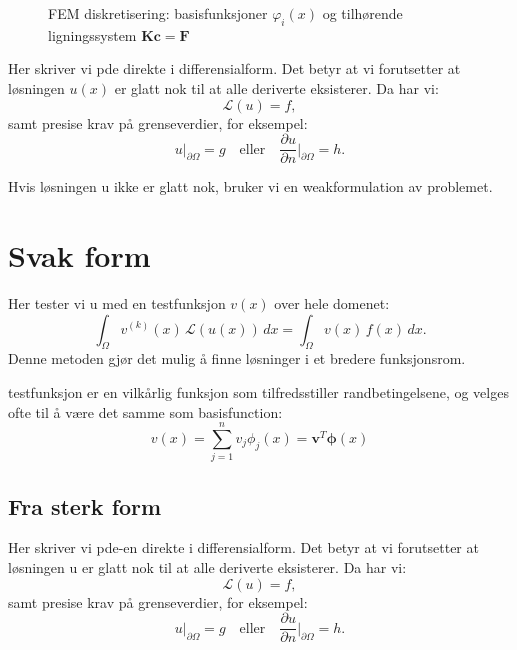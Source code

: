 \begin{figure}[H]
    \caption{FEM diskretisering: basisfunksjoner $\varphi_i(x)$ og tilhørende ligningssystem $\mathbf{K}\mathbf{c} = \mathbf{F}$}
    \label{fig:fem_discretization}
\end{figure}


Her skriver vi pde direkte i differensialform.
Det betyr at vi forutsetter at løsningen \(u(x)\) er glatt nok til at alle deriverte eksisterer.
Da har vi:
\[
    \mathcal{L}(u) = f,
\]
samt presise krav på grenseverdier, for eksempel:
\[
    u|_{\partial \Omega} = g \quad \text{eller} \quad \frac{\partial u}{\partial n}\bigg|_{\partial \Omega} = h.
\]

Hvis løsningen u ikke er glatt nok, bruker vi en weakformulation av problemet.

\section{Svak form}

Her tester vi u med en testfunksjon \(v(x)\) over hele domenet:
\[
    \int_\Omega v^{(k)}(x) \, \mathcal{L}(u(x)) \, dx = \int_\Omega v(x) \, f(x) \, dx.
\]
Denne metoden gjør det mulig å finne løsninger i et bredere funksjonsrom.

testfunksjon er en vilkårlig funksjon som tilfredsstiller randbetingelsene, og velges ofte til å være det samme som basisfunction:
\[
    v(x) = \sum_{j=1}^n v_j \phi_j(x) = \symbf{v}^T \symbf{\phi}(x)
\]


\subsection{Fra sterk form}
Her skriver vi pde-en direkte i differensialform. Det betyr at vi forutsetter at løsningen u er glatt nok til at alle deriverte eksisterer. Da har vi:
\[
    \mathcal{L}(u) = f,
\]
samt presise krav på grenseverdier, for eksempel:
\[
    u|_{\partial \Omega} = g \quad \text{eller} \quad \frac{\partial u}{\partial n}\bigg|_{\partial \Omega} = h.
\]

